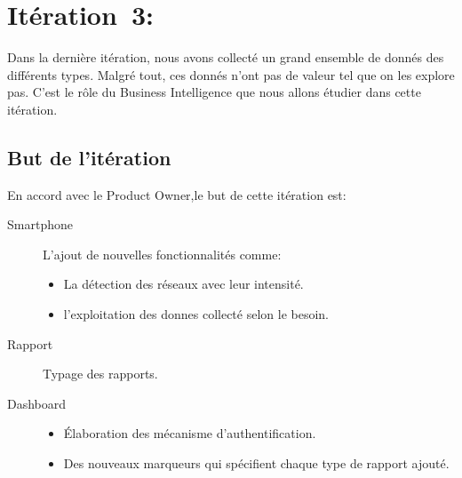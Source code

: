 \chapter[Itération~3:~(~4/3/2017~-~4/28/2017~)]{Itération~3:~\textup{}}


Dans la dernière itération, nous avons collecté un grand ensemble de donnés des
différents types. Malgré tout, ces donnés n'ont pas de valeur tel que on les
explore pas. C'est le rôle du Business Intelligence que nous allons étudier
dans cette itération.

\section{But de l'itération}

En accord avec le Product Owner,le but de cette itération est:

\begin{description}
    \item [Smartphone] L'ajout de nouvelles fonctionnalités comme:
        \begin{itemize}
            \item La détection des réseaux avec leur intensité.
            \item l'exploitation des donnes collecté selon le besoin.
        \end{itemize}
    \item [Rapport] Typage des rapports.
    \item [Dashboard] \textbf{}

        \begin{itemize}
            \item Élaboration des mécanisme d'authentification.
            \item Des nouveaux marqueurs qui spécifient chaque type de rapport
                ajouté.
        \end{itemize}
\end{description}


